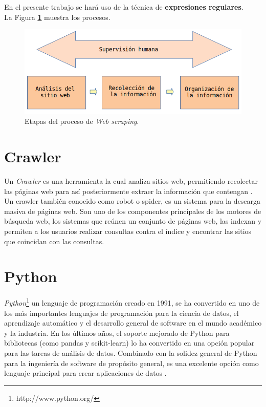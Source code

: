 En el presente trabajo se hará uso de la técnica de \textbf{expresiones regulares}.\\
La Figura \textbf{\ref{fig:procesos}} muestra los procesos.

\begin{figure}[H]
    \centering
    \includegraphics[scale=.35]{imagenes/Capitulo3/procesos}
    \caption{Etapas del proceso de \textit{Web scraping}.}
    \label{fig:procesos}
  \end{figure}
  

\section{Crawler}
Un \textit{Crawler}  es una herramienta la cual analiza sitios web, permitiendo recolectar 
las páginas web para así posteriormente extraer la información que contengan \citep{CTCrawler}. Un crawler también 
conocido como robot o spider, es un sistema para la descarga masiva de páginas web. Son uno de 
los componentes principales de los motores de búsqueda web, los sistemas que reúnen un conjunto de 
páginas web, las indexan y permiten a los usuarios realizar consultas contra el índice y encontrar las 
sitios que coincidan con las consultas.


\section{Python}
\textit{Python}\footnote{http://www.python.org/} un lenguaje de programación creado en 1991, se ha convertido en uno de los más 
importantes lenguajes de programación para la ciencia de datos, el aprendizaje automático y el desarrollo general de software en 
el mundo académico y la industria. 
En los últimos años, el soporte mejorado de Python para bibliotecas (como pandas y scikit-learn) lo ha convertido en una opción popular 
para las tareas de análisis de datos. Combinado con la solidez general de Python para la ingeniería de software de propósito general, 
es una excelente opción como lenguaje principal para crear aplicaciones de datos \citep{CTPython}.

